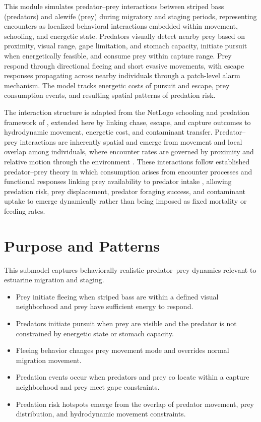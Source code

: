 \documentclass[
]{book}
\begin{document}
This module simulates predator--prey interactions between striped bass (predators) and alewife (prey) during migratory and staging periods, representing encounters as localized behavioral interactions embedded within movement, schooling, and energetic state. Predators visually detect nearby prey based on proximity, visual range, gape limitation, and stomach capacity, initiate pursuit when energetically feasible, and consume prey within capture range. Prey respond through directional fleeing and short evasive movements, with escape responses propagating across nearby individuals through a patch-level alarm mechanism. The model tracks energetic costs of pursuit and escape, prey consumption events, and resulting spatial patterns of predation risk.

The interaction structure is adapted from the NetLogo schooling and predation framework of \citep{dobon_netlogo_2018}, extended here by linking chase, escape, and capture outcomes to hydrodynamic movement, energetic cost, and contaminant transfer. Predator--prey interactions are inherently spatial and emerge from movement and local overlap among individuals, where encounter rates are governed by proximity and relative motion through the environment \citep{northfield_spatial_2017}. These interactions follow established predator--prey theory in which consumption arises from encounter processes and functional responses linking prey availability to predator intake \citep{diz-pita_predatorprey_2021}, allowing predation risk, prey displacement, predator foraging success, and contaminant uptake to emerge dynamically rather than being imposed as fixed mortality or feeding rates.

\section{Purpose and Patterns}\label{purpose-and-patterns-1}

This submodel captures behaviorally realistic predator--prey dynamics relevant to estuarine migration and staging.

\begin{itemize}
\item
  Prey initiate fleeing when striped bass are within a defined visual neighborhood and prey have sufficient energy to respond.
\item
  Predators initiate pursuit when prey are visible and the predator is not constrained by energetic state or stomach capacity.
\item
  Fleeing behavior changes prey movement mode and overrides normal migration movement.
\item
  Predation events occur when predators and prey co locate within a capture neighborhood and prey meet gape constraints.
\item
  Predation risk hotspots emerge from the overlap of predator movement, prey distribution, and hydrodynamic movement constraints.
\end{itemize}
\end{document}
